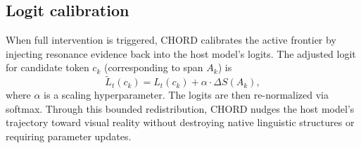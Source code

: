 \subsection{Logit calibration}

When full intervention is triggered, CHORD calibrates the active frontier by injecting resonance evidence back into the host model's logits. The adjusted logit for candidate token $c_k$ (corresponding to span $A_k$) is
\begin{equation}
  \tilde{L}_t(c_k) = L_t(c_k) + \alpha \cdot \Delta S(A_k),
\end{equation}
where $\alpha$ is a scaling hyperparameter. The logits are then re-normalized via softmax. Through this bounded redistribution, CHORD nudges the host model's trajectory toward visual reality without destroying native linguistic structures or requiring parameter updates.
